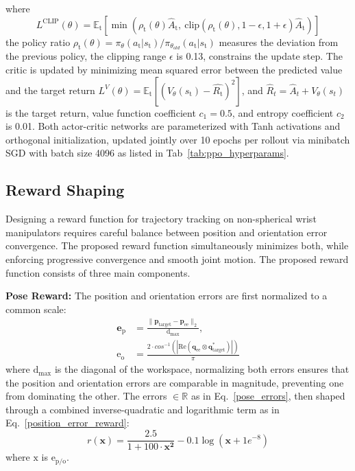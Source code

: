 \documentclass[preprint,12pt]{elsarticle}
\begin{document}
where \[L^{\text{CLIP}}(\theta) = \mathbb{E}_\text{t}\left[\min\left(\rho_\text{t}(\theta)\hat{A}_\text{t},\ \text{clip}(\rho_\text{t}(\theta), 1 - \epsilon, 1 + \epsilon)\hat{A}_\text{t}\right)\right]\]
the policy ratio $\rho_\text{t}(\theta) = \pi_{\theta}(a_\text{t}|s_\text{t})/\pi_{\theta_{old}}(a_\text{t}|s_\text{t})$ measures the deviation from the previous policy, the clipping range $\epsilon$ is 0.13, constrains the update step. The critic is updated by minimizing
mean squared error between the predicted value and the target return $
L^{V}(\theta) = \mathbb{E}_\text{t}[(V_{\theta}(s_\text{t}) - \hat{R_\text{t}})^{2}]
$, and $\hat{R}_{t} = \hat{A}_{t} + V_{\theta}(s_{t})$ is the target return, value function coefficient $c_{1} = 0.5$, and entropy coefficient $c_{2}$ is 0.01. Both actor-critic networks are parameterized with Tanh activations and orthogonal initialization, updated jointly over 10 epochs per rollout via minibatch SGD with batch size 4096 as listed in Tab~\ref{tab:ppo_hyperparams}.
\subsection{Reward Shaping}
\label{reward_function}
Designing a reward function for trajectory tracking on non-spherical wrist manipulators requires careful balance between position and orientation error convergence. The proposed reward function simultaneously minimizes both, while enforcing progressive convergence and smooth joint motion. The proposed reward function consists of three main components.

\noindent \textbf{Pose Reward:}
The position and orientation errors are first normalized to a common scale:
\begin{equation}
    \begin{split}
    {\mathbf{\text{e}}}_{\text{p}} &= \frac{\|\mathbf{\text{p}}_\text{target} - \mathbf{\text{p}}_\text{ee}\|_{2}}{\text{d}_\text{max}}, \\ {\text{e}}_{\text{o}} &= \frac{2\cdot cos^{-1}(|\text{Re}(\mathbf{\text{q}}_\text{ee} \otimes \mathbf{\text{q}}_\text{target}^{*})|)}{\pi}
    \end{split}
    \label{pose_errors}
\end{equation}
where $\text{d}_{\text{max}}$ is the diagonal of the workspace, normalizing both errors ensures that the position and orientation errors are comparable in magnitude, preventing one from dominating the other.
The errors $\in\mathbb{R}$ as in Eq.~\ref{pose_errors}, then shaped through a combined inverse-quadratic and logarithmic term as in Eq.~\ref{position_error_reward}:
\begin{equation}
    r({\mathbf{\text{x}}}) = \frac{2.5}{1 + 100 \cdot \mathbf{\text{x}^{\text{2}}}}  - 0.1\log(\mathbf{\text{x}} + 1e^{-8})
    \label{position_error_reward}
\end{equation}
where $\text{x}$ is $\text{e}_\text{p/o}$.
\end{document}
